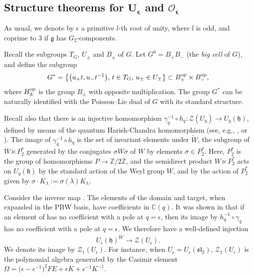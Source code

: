 \documentclass[pdftex]{sigma}
\numberwithin{equation}{section}
\theoremstyle{definition}
\newcommand{\e}{\epsilon}
\newcommand{\mc}{\mathbb{C}}
\newcommand{\mz}{\mathbb{Z}}
\newcommand{\Oo}{{\mathcal O}}
\newcommand{\ra}{\rightarrow}
\begin{document}
\subsection[Structure theorems for U\_e and O\_e]{Structure theorems for $\boldsymbol{U_\e}$ and $\boldsymbol{\Oo_\e}$} \label{UOUlf}
As usual, we denote by $\e$ a primitive $l$-th root of unity, where $l$ is odd, and coprime to $3$ if $\mathfrak{g}$ has $G_2$-components.

Recall the subgroups $T_G$, $U_\pm$ and $B_\pm$ of $G$. Let $G^0 = B_+B_-$ (the {\it big cell} of $G$), and define the subgroup
\[G^* = \big\{\big(u_+t,u_-t^{-1}\big), \,t\in T_G,\, u_\pm \in U_\pm\big\}\subset B_+^{\rm op}\times B_-^{\rm op},\]
where $B_\pm^{\rm op}$ is the group $B_\pm$ with opposite multiplication. The group $G^*$ can be naturally identified with the Poisson--Lie dual of $G$ with its standard structure.


Recall also that there is an injective homomorphism $\gamma_q^{-1}\circ h_q\colon \mathcal{Z}(U_q) \ra U_q(\mathfrak{h})$, defined by means of the quantum Harish-Chandra homomorphism (see, e.g., \cite[Section 9.1.C]{CP}, or \cite[Section 3.13]{VY}). The image of $\gamma_q^{-1}\circ h_q$ is the set  of invariant elements under $\tilde{W}$, the subgroup of $W\ltimes P_2^*$ generated by the conjugates $\sigma W \sigma$ of $W$ by elements $\sigma\in P_2^*$. Here, $P_2^*$ is the group of homomorphisms $P\ra \mz/2\mz$, and the semidirect product $W\ltimes P_2^*$ acts on $U_q(\mathfrak{h})$ by the standard action of the Weyl group $W$, and by the action of $P_2^*$ given by $\sigma\cdot K_\lambda := \sigma(\lambda)K_\lambda$.

Consider the inverse map \smash{$h_q^{-1}\circ \gamma_q \colon U_q(\mathfrak{h})^{\tilde{W}} \ra \mathcal{Z}(U_q)$}. The elements of the domain and target, when expanded in the PBW basis, have coefficients in $\mc(q)$. It was shown in \cite[Section 21.1]{DC-K-P2} that if an element of  has no coefficient with a pole at $q=\e$, then its image by $h_q^{-1}\circ \gamma_q$ has no coefficient with a pole at $q=\e$. We therefore have a well-defined injection
\[U_\e(\mathfrak{h})^{\tilde{W}}\ra \mathcal{Z}(U_\e).\]
We denote its image by $\mathcal{Z}_1(U_\e)$. For instance, when $U_\e = U_\e({\mathfrak{sl}_2})$, $\mathcal{Z}_1(U_\e)$ is the polynomial algebra generated by the Casimir element $\Omega=\big(\e-\e^{-1}\big)^2FE+\e K+\e^{-1}K^{-1}$.
\end{document}
